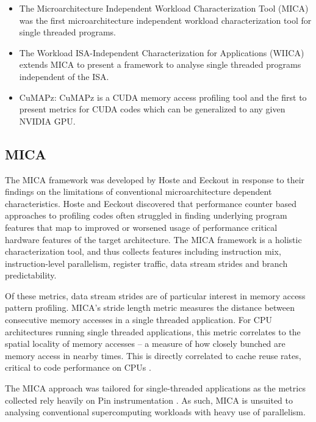 \documentclass[review=false, sigchi]{acmart}
\begin{document}
	\begin{itemize}
		\item The Microarchitecture Independent Workload Characterization Tool (MICA) \cite{hoste2007microarchitecture} was the first microarchitecture independent workload characterization tool for single threaded programs. 
		\item The Workload ISA-Independent Characterization for Applications (WIICA) \cite{shao2013isa} extends MICA to present a framework to analyse single threaded programs independent of the ISA.
		\item CuMAPz: CuMAPz \cite{kim2011cumapz} is a CUDA memory access profiling tool and the first to present metrics for CUDA codes which can be generalized to any given NVIDIA GPU.
	\end{itemize}
	
	\subsection{MICA}
	
	The MICA framework was developed by Hoste and Eeckout \cite{hoste2007microarchitecture} in response to their findings on the limitations of conventional microarchitecture dependent characteristics. Hoste and Eeckout discovered that performance counter based approaches to profiling codes often struggled in finding underlying program features that map to improved or worsened usage of performance critical hardware features of the target architecture. The MICA framework is a holistic characterization tool, and thus collects features including instruction mix, instruction-level parallelism, register traffic, data stream strides and branch predictability.
	
	Of these metrics, data stream strides are of particular interest in memory access pattern profiling. MICA's stride length metric measures the distance between consecutive memory accesses in a single threaded application. For CPU architectures running single threaded applications, this metric correlates to the spatial locality of memory accesses -- a measure of how closely bunched are memory access in nearby times. This is directly correlated to cache reuse rates, critical to code performance on CPUs \cite{inteloptimisation}. %
	
	The MICA approach was tailored for single-threaded applications as the metrics collected rely heavily on Pin instrumentation \cite{luk2005pin}. As such, MICA is unsuited to analysing conventional supercomputing workloads with heavy use of parallelism.
\end{document}
